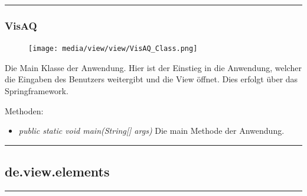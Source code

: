 \rule{\textwidth}{0.4pt}
\subsubsection{VisAQ}
\begin{minipage}{0.3\textwidth}
    \begin{figure}[H]
        {\centering\texttt{[image: media/view/view/VisAQ\_Class.png]}}
    \end{figure}
    \end{minipage} \hfill
    \begin{minipage}{0.6\textwidth}
Die Main Klasse der Anwendung. Hier ist der Einstieg in die Anwendung, welcher die Eingaben des Benutzers weitergibt und die View öffnet. Dies erfolgt über das Springframework.
\end{minipage}
Methoden: \begin{itemize} [noitemsep]
    \item \emph{public static void main(String[] args)} Die main Methode der Anwendung.
\end{itemize} 

\rule{\textwidth}{0.4pt}
\subsection{de.view.elements}

\rule{\textwidth}{0.4pt}
